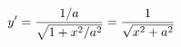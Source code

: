 \documentclass[preview]{standalone}
\begin{document}
\begin{align*}
\special{dvisvgm:raw <g id='unique000'>}y'=\dfrac{1/a}{\sqrt{1+x^2/a^2}}=\dfrac{1}{\sqrt{x^2+a^2}}\special{dvisvgm:raw </g>}
\end{align*}
\end{document}
